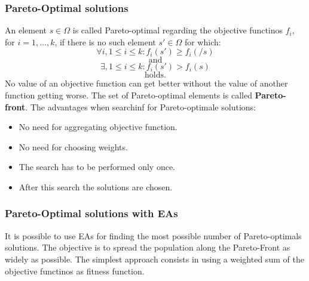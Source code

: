\documentclass{article}
\begin{document}
\subsubsection{Pareto-Optimal solutions}
An element $s\in\Omega$ is called Pareto-optimal regarding the objective functinos $f_i$,
for $i=1,\dots,k$, if there is no such element $s'\in\Omega$ for which:
$$ \forall i,1\leq i\leq k: f_i(s')\geq f_i(/s)$$
$$\text{and}$$
$$\exists, 1\leq i\leq k: f_i(s')>f_i(s)$$
$$\text{holds.}$$
No value of an objective function can get better without the value of another function
getting worse. The set of Pareto-optimal elements is called \textbf{Pareto-front}.
\newline\newline
The advantages when searchinf for Pareto-optimale solutions:
\begin{itemize}
    \item No need for aggregating objective function.
    \item No need for choosing weights.
    \item The search has to be performed only once.
    \item After this search the solutions are chosen.
\end{itemize}

\subsubsection{Pareto-Optimal solutions with EAs}
It is possible to use EAs for finding the most possible number of Pareto-optimals solutions.
The objective is to spread the population along the Pareto-Front as widely as possible. The
simplest approach consists in using a weighted sum of the objective functinos as fitness function.
\end{document}
